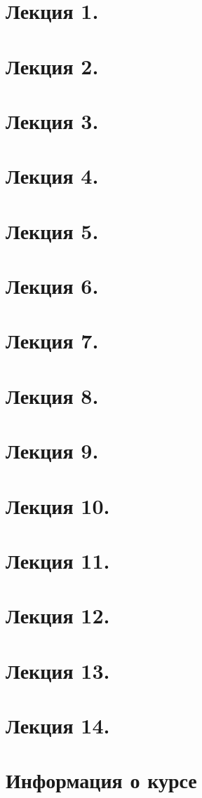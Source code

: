 \newpage

\section{Лекция 1.}

\newpage
\section{Лекция 2.}

\newpage
\section{Лекция 3.}

\newpage
\section{Лекция 4.}

\newpage
\section{Лекция 5.}

\newpage
\section{Лекция 6.}

\newpage
\section{Лекция 7.}

\newpage
\section{Лекция 8.}

\newpage
\section{Лекция 9.}

\newpage
\section{Лекция 10.}

\newpage
\section{Лекция 11.}

\newpage
\section{Лекция 12.}

\newpage
\section{Лекция 13.}

\newpage
\section{Лекция 14.}

\newpage
\section{Информация о курсе}
